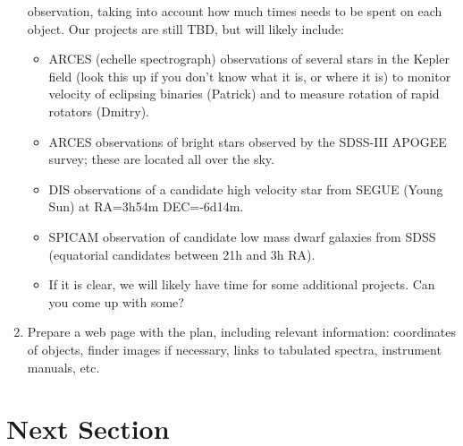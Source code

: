 \documentclass[12pt]{article}
\begin{document}
\begin{enumerate}[1.]
        observation, taking into account how much times needs to be spent on
        each object. Our projects are still TBD, but will likely include:
        \begin{itemize}
            \item ARCES (echelle spectrograph) observations of several stars
                in the Kepler field (look this up if you don't know what it is,
                or where it is) to monitor velocity of eclipsing binaries
                (Patrick) and to measure rotation of rapid rotators (Dmitry).
            \item ARCES observations of bright stars observed by the SDSS-III
                APOGEE survey; these are located all over the sky.
            \item DIS observations of a candidate high velocity star from SEGUE
                (Young Sun) at RA=3h54m DEC=-6d14m.
            \item SPICAM observation of candidate low mass dwarf galaxies from
                SDSS (equatorial candidates between 21h and 3h RA).
            \item If it is clear, we will likely have time for some additional
                projects. Can you come up with some?
        \end{itemize}
    \item Prepare a web page with the plan, including relevant information:
        coordinates of objects, finder images if necessary, links to tabulated
        spectra, instrument manuals, etc.
\end{enumerate}

\newpage
\section*{Next Section}

\end{document}
